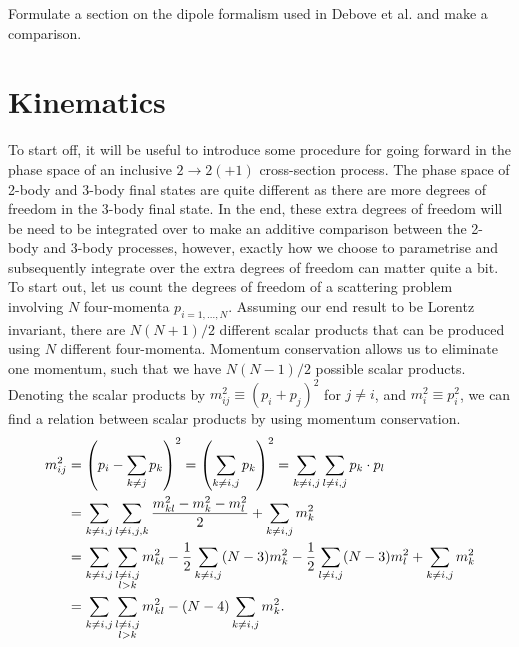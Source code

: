 \begin{TODO}
    \item Formulate a section on the dipole formalism used in Debove et al. and make a comparison.
\end{TODO}

\section{Kinematics}
    To start off, it will be useful to introduce some procedure for going forward in the phase space of an inclusive \(2\to 2(+1)\) cross-section process.
    The phase space of 2-body and 3-body final states are quite different as there are more degrees of freedom in the 3-body final state.
    In the end, these extra degrees of freedom will be need to be integrated over to make an additive comparison between the 2-body and 3-body processes, however, exactly how we choose to parametrise and subsequently integrate over the extra degrees of freedom can matter quite a bit.
    \medskip
    To start out, let us count the degrees of freedom of a scattering problem involving \(N\) four-momenta \(p_{i=1,\ldots,N}\).
    Assuming our end result to be Lorentz invariant, there are \(N(N+1)/2\) different scalar products that can be produced using \(N\) different four-momenta.
    Momentum conservation allows us to eliminate one momentum, such that we have \(N(N-1)/2\) possible scalar products.
    Denoting the scalar products by \(m^2_{ij} \equiv (p_i + p_j)^2\) for \(j \neq i\), and \(m^2_i \equiv p_i^2\), we can find a relation between scalar products by using momentum conservation.
    \begin{align} \nonumber
        m^2_{ij} & = \left(p_i - \sum_{k\neq j} p_k\right)^2 = \left(\sum_{k\neq i,j} p_k\right)^2 = \sum_{k\neq i,j} \sum_{l\neq i,j} p_k\cdot p_l \\
        \nonumber
                 & = \sum_{k\neq i,j} \sum_{l\neq i,j,k} \frac{m^2_{kl} - m^2_k - m^2_l}{2} + \sum_{k\neq i,j} m^2_k                          \\
        \nonumber
                 & = \sum_{k\neq i,j} \sum_{\substack{l\neq i,j                                                                               \\l>k}} m^2_{kl} - \frac{1}{2} \sum_{k\neq i, j} (N-3) m^2_k - \frac{1}{2} \sum_{l\neq i,j} (N-3) m^2_l + \sum_{k\neq i,j} m^2_k \\
                 & = \sum_{k\neq i,j} \sum_{\substack{l\neq i,j                                                                               \\l>k}} m^2_{kl} - (N-4) \sum_{k\neq i, j} m^2_k.
    \end{align}
